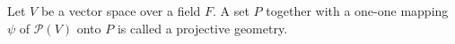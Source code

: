 Let $V$ be a vector space over a field $F$. A set $P$ together with a one-one mapping $\psi$ of $\mathcal{P}(V)$ onto $P$ is called a projective geometry.
